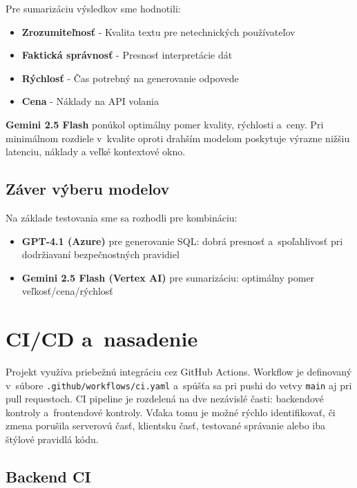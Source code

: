 \documentclass[a4paper, 12pt]{article}
\begin{document}
Pre sumarizáciu výsledkov sme hodnotili:

\begin{itemize}
    \item \textbf{Zrozumiteľnosť} - Kvalita textu pre netechnických používateľov
    \item \textbf{Faktická správnosť} - Presnosť interpretácie dát
    \item \textbf{Rýchlosť} - Čas potrebný na generovanie odpovede
    \item \textbf{Cena} - Náklady na API volania
\end{itemize}

\textbf{Gemini 2.5 Flash} ponúkol optimálny pomer kvality, rýchlosti a~ceny. Pri minimálnom rozdiele v~kvalite oproti drahším modelom poskytuje výrazne nižšiu latenciu, náklady a veľké kontextové okno.

\subsection{Záver výberu modelov}

Na základe testovania sme sa rozhodli pre kombináciu:

\begin{itemize}
    \item \textbf{GPT-4.1 (Azure)} pre generovanie SQL: dobrá presnosť a~spoľahlivosť pri dodržiavaní bezpečnostných pravidiel
    \item \textbf{Gemini 2.5 Flash (Vertex AI)} pre sumarizáciu: optimálny pomer veľkosť/cena/rýchlosť
\end{itemize}


\clearpage

\section{CI/CD a~nasadenie}

Projekt využíva priebežnú integráciu cez GitHub Actions. Workflow je definovaný v~súbore \texttt{.github/workflows/ci.yaml} a~spúšťa sa pri pushi do vetvy \texttt{main} aj pri pull requestoch. CI pipeline je rozdelená na dve nezávislé časti: backendové kontroly a~frontendové kontroly. Vďaka tomu je možné rýchlo identifikovať, či zmena porušila serverovú časť, klientsku časť, testované správanie alebo iba štýlové pravidlá kódu.

\subsection{Backend CI}
\end{document}
